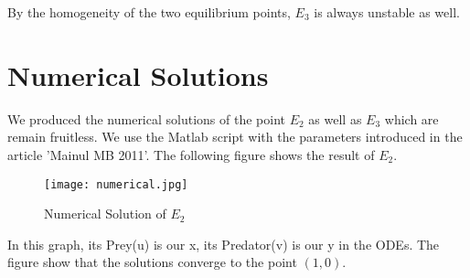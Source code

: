 \documentclass{article}
\begin{document}
\par By the homogeneity of the two equilibrium points, $E_{3}$ is always unstable as well.\\

\section{Numerical Solutions}
We produced the numerical solutions of the point $E_{2}$ as well as $E_{3}$ which are remain fruitless. We use the Matlab script with the parameters introduced in the article 'Mainul MB 2011'. The following figure shows the result of $E_{2}$.

\begin{figure}[htbp]
    \centering
    \texttt{[image: numerical.jpg]}
    \caption{Numerical Solution of $E_{2}$}
\end{figure}

In this graph, its Prey(u) is our x, its Predator(v) is our y in the ODEs. The figure show that the solutions converge to the point $(1,0)$.
\end{document}
